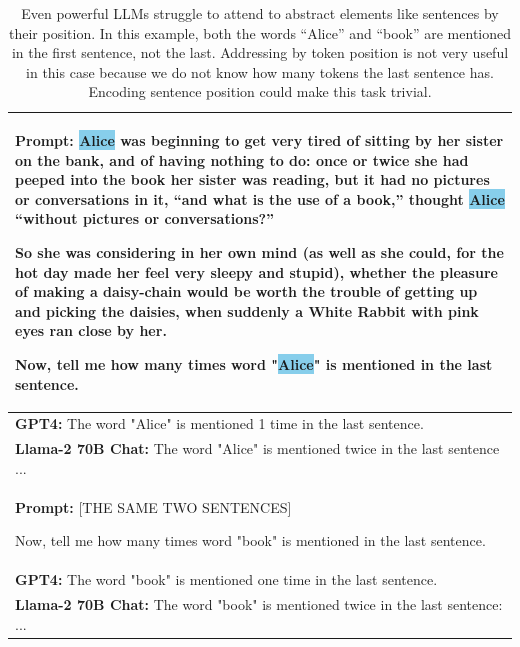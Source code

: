 \documentclass{article}
\begin{document}
\begin{table}[t]
    \caption{Even powerful LLMs struggle to attend to abstract elements like sentences by their position. In this example, both the words ``Alice'' and ``book'' are mentioned in the first sentence, not the last. Addressing by token position is not very useful in this case because we do not know how many tokens the last sentence has.
    Encoding sentence position could make this task trivial.}
    \vspace{2mm}
    \label{tab:prompt}
    \centering
    \small
    \begin{tabular}{m{}}
    \toprule
    {\bf Prompt:} {\setlength{\fboxsep}{1pt}\colorbox{SkyBlue}{Alice}} was beginning to get very tired of sitting by her sister on the bank, and of having nothing to do: once or twice she had peeped into the {\setlength{\fboxsep}{1pt}\colorbox{BurntOrange}{book}} her sister was reading, but it had no pictures or conversations in it, “and what is the use of a {\setlength{\fboxsep}{1pt}\colorbox{BurntOrange}{book}},” thought {\setlength{\fboxsep}{1pt}\colorbox{SkyBlue}{Alice}} “without pictures or conversations?”
    \newline

    So she was considering in her own mind (as well as she could, for the hot day made her feel very sleepy and stupid), whether the pleasure of making a daisy-chain would be worth the trouble of getting up and picking the daisies, when suddenly a White Rabbit with pink eyes ran close by her.
    \newline

    Now, tell me how many times word "{\setlength{\fboxsep}{1pt}\colorbox{SkyBlue}{Alice}}" is mentioned in the last sentence. \\
    \midrule
    {\bf GPT4:}  The word "Alice" is mentioned 1 time in the last sentence. \\
    \midrule
    {\bf Llama-2 70B Chat:} The word "Alice" is mentioned twice in the last sentence ... \\
    \midrule
    \midrule
    {\bf Prompt:} [THE SAME TWO SENTENCES]
    \newline
    
    Now, tell me how many times word "{\setlength{\fboxsep}{1pt}\colorbox{BurntOrange}{book}}" is mentioned in the last sentence. \\
    \midrule
    {\bf GPT4:} The word "book" is mentioned one time in the last sentence. \\
    \midrule
    {\bf Llama-2 70B Chat:} The word "book" is mentioned twice in the last sentence: ... \\
    \bottomrule
    \end{tabular}
\end{table}
\end{document}
